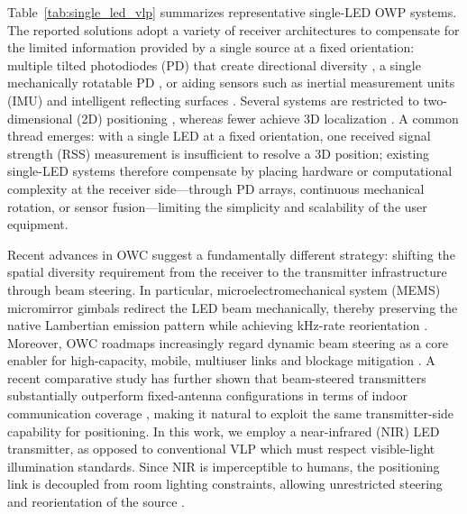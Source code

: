 \documentclass[journal]{IEEEtran}
\begin{document}
Table~\ref{tab:single_led_vlp} summarizes representative single-LED OWP systems. The reported solutions adopt a variety of receiver architectures to compensate for the limited information provided by a single source at a fixed orientation: multiple tilted photodiodes (PD) that create directional diversity \cite{Qin2020, Qin2021, Zia-Ul-Mustafa2023, Zhang2024, Li2024}, a single mechanically rotatable PD \cite{Liu2022, Wang2024, Shi2025}, or aiding sensors such as inertial measurement units (IMU) \cite{Ma2024} and intelligent reflecting surfaces \cite{ShiJin2025}. Several systems are restricted to two-dimensional (2D) positioning \cite{Chen2021, Qin2021, Liu2022, Zia-Ul-Mustafa2023, Chassagne2025, Zhang2024, Wang2024, Shi2025, ShiJin2025}, whereas fewer achieve 3D localization \cite{Qin2020, Li2024, Ma2024}. A common thread emerges: with a single LED at a fixed orientation, one received signal strength (RSS) measurement is insufficient to resolve a 3D position; existing single-LED systems therefore compensate by placing hardware or computational complexity at the receiver side---through PD arrays, continuous mechanical rotation, or sensor fusion---limiting the simplicity and scalability of the user equipment.

Recent advances in OWC suggest a fundamentally different strategy: shifting the spatial diversity requirement from the receiver to the transmitter infrastructure through beam steering. In particular, microelectromechanical system (MEMS) micromirror gimbals redirect the LED beam mechanically, thereby preserving the native Lambertian emission pattern while achieving kHz-rate reorientation \cite{Liu:25}. Moreover, OWC roadmaps increasingly regard dynamic beam steering as a core enabler for high-capacity, mobile, multiuser links and blockage mitigation \cite{mi13070990, Zeng2023, Jin2023}. A recent comparative study has further shown that beam-steered transmitters substantially outperform fixed-antenna configurations in terms of indoor communication coverage \cite{AlSatai2026}, making it natural to exploit the same transmitter-side capability for positioning. In this work, we employ a near-infrared (NIR) LED transmitter, as opposed to conventional VLP which must respect visible-light illumination standards. Since NIR is imperceptible to humans, the positioning link is decoupled from room lighting constraints, allowing unrestricted steering and reorientation of the source \cite{Zhu2025}.
\end{document}
